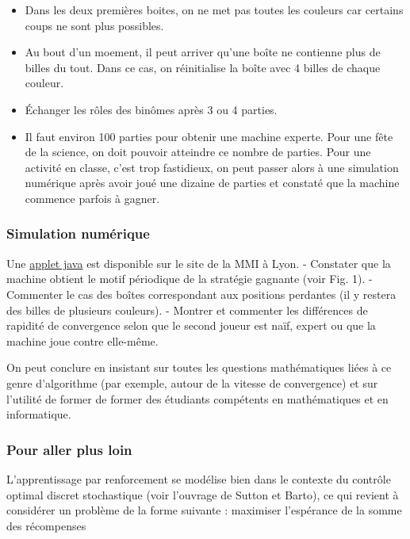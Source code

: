 \begin{itemize}
\tightlist
\item
  Dans les deux premières boites, on ne met pas toutes les couleurs car
  certains coups ne sont plus possibles.
\item
  Au bout d'un moement, il peut arriver qu'une boîte ne contienne plus
  de billes du tout. Dans ce cas, on réinitialise la boîte avec 4 billes
  de chaque couleur.
\item
  Échanger les rôles des binômes après 3 ou 4 parties.
\item
  Il faut environ 100 parties pour obtenir une machine experte. Pour une
  fête de la science, on doit pouvoir atteindre ce nombre de parties.
  Pour une activité en classe, c'est trop fastidieux, on peut passer
  alors à une simulation numérique après avoir joué une dizaine de
  parties et constaté que la machine commence parfois à gagner.
\end{itemize}

\hypertarget{simulation-numuxe9rique}{%
\subsubsection{Simulation numérique}\label{simulation-numuxe9rique}}

Une
\href{https://u.pcloud.link/publink/show?code=XZsn7zVZrWj4xUeBzmhLp8Pxd7ismY5ezrMX}{applet
java} est disponible sur le site de la MMI à Lyon. - Constater que la
machine obtient le motif périodique de la stratégie gagnante (voir Fig.
1). - Commenter le cas des boîtes correspondant aux positions perdantes
(il y restera des billes de plusieurs couleurs). - Montrer et commenter
les différences de rapidité de convergence selon que le second joueur
est naïf, expert ou que la machine joue contre elle-même.

On peut conclure en insistant sur toutes les questions mathématiques
liées à ce genre d'algorithme (par exemple, autour de la vitesse de
convergence) et sur l'utilité de former de former des étudiants
compétents en mathématiques et en informatique.

\hypertarget{pour-aller-plus-loin}{%
\subsubsection{Pour aller plus loin}\label{pour-aller-plus-loin}}

L'apprentissage par renforcement se modélise bien dans le contexte du
contrôle optimal discret stochastique (voir l'ouvrage de Sutton et
Barto), ce qui revient à considérer un problème de la forme suivante :
maximiser l'espérance de la somme des récompenses

